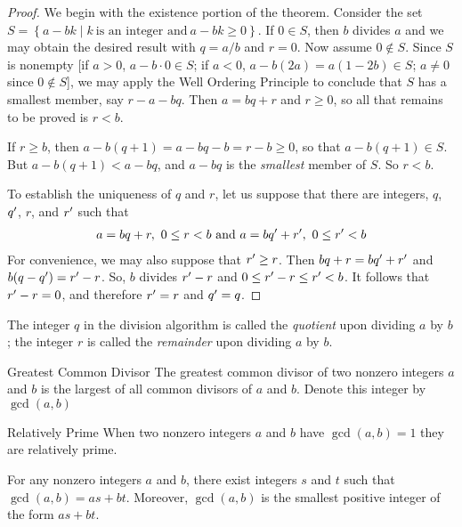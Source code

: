 \documentclass[../butidigress.tex]{subfiles}
\begin{document}
\begin{proof}
We begin with the existence portion of the theorem.
Consider the set $S = \left\{a - bk\mid k\ \text{is an integer and}\ a - bk \geq 0 \right\}$.
If $0 \in S$, then $b$ divides $a$ and we may obtain the desired result with $q = a/b$ and $r = 0$.
Now assume $0 \notin S$.
Since $S$ is nonempty [if $a>0$, $a-b\cdot 0 \in S$; if $a < 0$, $a - b(2a) = a(1 - 2b) \in S$; $a \neq 0$ since $0 \notin S$], we may apply the Well Ordering Principle to conclude that $S$ has a smallest member, say $r - a - bq$.
Then $a = bq + r$ and $r \geq 0$, so all that remains to be proved is $r < b$.

If $r \geq b$, then $a - b(q + 1) = a - bq - b = r - b \geq 0$, so that $a - b(q + 1) \in S$.
But $a - b(q + 1) < a - bq$, and $a - bq$ is the \emph{smallest} member of $S$.
So $r < b$.

To establish the uniqueness of $q$ and $r$, let us suppose that there are integers, $q$, ${q}^{\prime}$, $r$, and ${r}^{\prime}$ such that
\begin{align*}
a = bq + r,\ 0\leq r < b\ \text{and}\ a = b\vprime{q} + \vprime{r},\ 0 \leq \vprime{r} < b
\end{align*}
For convenience, we may also suppose that ${r}^{\prime} \geq r$.
Then $bq + r = b{q}^{\prime} + {r}^{\prime}$ and $b(q - {q}^{\prime}) = {r}^{\prime} - r$.
So, $b$ divides ${r}^{\prime} - r$ and $0 \leq {r}^{\prime} - r \leq {r}^{\prime} < b$.
It follows that ${r}^{\prime} - r = 0$, and therefore ${r}^{\prime} = r$ and ${q}^{\prime} = q$.
\end{proof}

The integer $q$ in the division algorithm is called the \emph{quotient} upon dividing $a$ by $b$; the integer $r$ is called the \emph{remainder} upon dividing $a$ by $b$.

\begin{definition}{Greatest Common Divisor}
The greatest common divisor of two nonzero integers $a$ and $b$ is the largest of all common divisors of $a$ and $b$.
Denote this integer by $\gcd(a, b)$
\end{definition}

\begin{definition}{Relatively Prime}
When two nonzero integers $a$ and $b$ have $\gcd(a,b)=1$ they are relatively prime.
\end{definition}

\begin{theorem}
For any nonzero integers $a$ and $b$, there exist integers $s$ and $t$ such that $\gcd(a,b) = as+bt$.
Moreover, $\gcd(a, b)$ is the smallest positive integer of the form $as + bt$.
\end{theorem}
\end{document}
